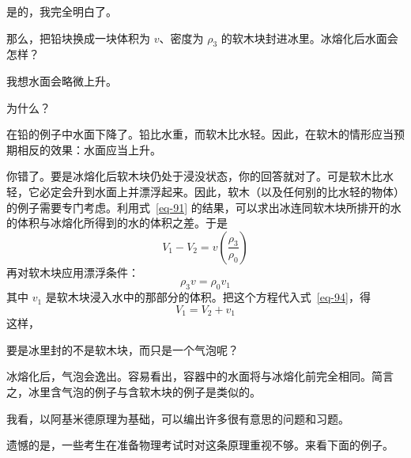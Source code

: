 \begin{dialogue}
\stda 是的，我完全明白了。

\tchr 那么，把铅块换成一块体积为 $v$、密度为 $\rho_{3}$ 的软木块封进冰里。冰熔化后水面会怎样？

\stda 我想水面会略微上升。

\tchr 为什么？

\stda 在铅的例子中水面下降了。铅比水重，而软木比水轻。因此，在软木的情形应当预期相反的效果：水面应当上升。

\tchr 你错了。要是冰熔化后软木块仍处于浸没状态，你的回答就对了。可是软木比水轻，它必定会升到水面上并漂浮起来。因此，软木（以及任何别的比水轻的物体）的例子需要专门考虑。利用式~\eqref{eq-91} 的结果，可以求出冰连同软木块所排开的水的体积与冰熔化所得到的水的体积之差。于是
\begin{equation}%
V_{1} - V_{2} = v \left( \frac{\rho_{3}}{\rho_{0}} \right)
\label{eq-94}
\end{equation}
再对软木块应用漂浮条件：
\begin{equation}%
\rho_{3}v  = \rho_{0}v_{1}
\label{eq-95}
\end{equation}
其中 $v_{1}$ 是软木块浸入水中的那部分的体积。把这个方程代入式~\eqref{eq-94}，得
\begin{equation*}%
V_{1} = V_{2} +v_{1}
\end{equation*}
这样，

\stda 要是冰里封的不是软木块，而只是一个气泡呢？

\tchr 冰熔化后，气泡会逸出。容易看出，容器中的水面将与冰熔化前完全相同。简言之，冰里含气泡的例子与含软木块的例子是类似的。

\stda 我看，以阿基米德原理为基础，可以编出许多很有意思的问题和习题。

\tchr 遗憾的是，一些考生在准备物理考试时对这条原理重视不够。来看下面的例子。


\end{dialogue}
